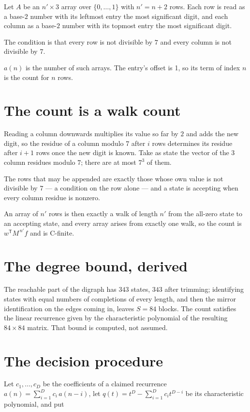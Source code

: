\documentclass[11pt]{article}
\theoremstyle{definition}
\begin{document}
Let $A$ be an $n' \times 3$ array over $\{0,\dots,1\}$ with $n' = n + 2$ rows. Each row is read as a base-$2$ number with its leftmost entry the most significant digit, and each column as a base-$2$ number with its topmost entry the most significant digit.

The condition is that every row is not divisible by $7$ and every column is not divisible by $7$.

$a(n)$ is the number of such arrays. The entry's offset is 1, so its term of index $n$ is the count for $n$ rows.

\section{The count is a walk count}

Reading a column downwards multiplies its value so far by $2$ and adds the new digit, so the residue of a column modulo $7$ after $i$ rows determines its residue after $i+1$ rows once the new digit is known. Take as state the vector of the $3$ column residues modulo $7$; there are at most $7^{3}$ of them.

The rows that may be appended are exactly those whose own value is not divisible by $7$ --- a condition on the row alone --- and a state is accepting when every column residue is nonzero.

An array of $n'$ rows is then exactly a walk of length $n'$ from the all-zero state to an accepting state, and every array arises from exactly one walk, so the count is $w^{\mathsf T}M^{\,n'}f$ and is C-finite.

\section{The degree bound, derived}

The reachable part of the digraph has $343$ states, $343$ after trimming; identifying states with equal numbers of completions of every length, and then the mirror identification on the edges coming in, leaves $S = 84$ blocks. The count satisfies the linear recurrence given by the characteristic polynomial of the resulting $84\times84$ matrix. That bound is computed, not assumed.

\section{The decision procedure}

Let $c_1,\dots,c_D$ be the coefficients of a claimed recurrence $a(n) = \sum_{i=1}^{D} c_i\,a(n-i)$, let $q(t) = t^{D} - \sum_{i=1}^{D} c_i t^{D-i}$ be its characteristic polynomial, and put
\end{document}
